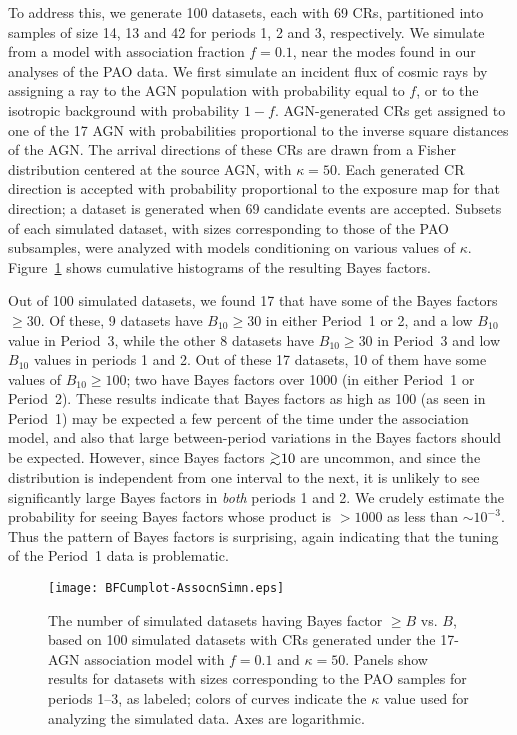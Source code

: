 To address this, we generate 100 datasets, each with 69 CRs, partitioned
into samples of size 14, 13 and 42 for periods 1, 2 and 3, respectively.  We
simulate from a model with association fraction $f=0.1$, near the modes
found in our analyses of the PAO data.  We first simulate an incident flux
of cosmic rays by assigning a ray to the AGN population with probability
equal to $f$, or to the isotropic background with probability $1-f$.
AGN-generated CRs get assigned to one of the 17 AGN with probabilities
proportional to the inverse square distances of the AGN. The arrival
directions of these CRs are drawn from a Fisher distribution centered at the
source AGN, with $\kappa = 50$.  Each generated CR direction is accepted
with probability proportional to the exposure map for that direction; a
dataset is generated when 69 candidate events are accepted.  Subsets
of each simulated dataset, with sizes corresponding to those of the
PAO subsamples, were analyzed with models conditioning on various
values of $\kappa$.  Figure~\ref{fig:assocCumBF} shows cumulative
histograms of the resulting Bayes factors.

Out of 100 simulated datasets, we found 17 that have some of the Bayes
factors $\geq 30$.  Of these, 9 datasets have $B_{10}\geq 30$ in either
Period~1 or 2, and a low $B_{10}$ value in Period~3, while the other 8
datasets have $B_{10}\geq 30$ in Period~3 and low $B_{10}$ values in periods
1 and 2.  Out of these 17 datasets, 10 of them have some values of
$B_{10}\geq 100$; two have Bayes factors over 1000 (in either Period~1
or Period~2).  
These results indicate that Bayes factors as high as 100 (as seen in Period~1)
may be expected a few percent of the time under the association model, and
also that large between-period variations in the Bayes factors should be
expected.  However, since Bayes factors $\gta 10$ are uncommon, and since the
distribution is independent from one interval to the next, it is unlikely to
see significantly large Bayes factors in {\em both} periods 1 and 2.  We
crudely estimate the probability for seeing Bayes factors whose product
is $> 1000$ as less than $\sim 10^{-3}$.  Thus the pattern of Bayes factors is
surprising, again indicating that the tuning of the Period~1 data is
problematic.

\begin{figure}
\centerline{\texttt{[image: BFCumplot-AssocnSimn.eps]}}
\caption{The number of simulated datasets having Bayes factor $\geq B$
vs. $B$, based on 100 simulated datasets with CRs generated under the
17-AGN association model with $f=0.1$ and $\kappa=50$.  Panels show
results for datasets with sizes corresponding to the PAO samples for
periods 1--3, as labeled; colors of curves indicate the $\kappa$ value
used for analyzing the simulated data.  Axes are logarithmic.}
\label{fig:assocCumBF}
\end{figure}
